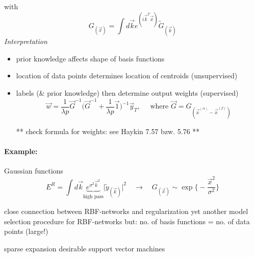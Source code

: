 with
\begin{equation} \tag{Fourier-transform of filter}
	G_{(\vec{x})} = \int d \vec{k} e^{(i \vec{k}^T \vec{x})}
		\widetilde{G}_{(\vec{k})}
\end{equation}
\emph{Interpretation}
\begin{itemize}
\item prior knowledge affects shape of basis functions
\item location of data points determines location of centroids (unsupervised)
\item labels (\& prior knowledge) then determine output weights (supervised)
\begin{equation}
	\vec{w} = \frac{1}{\lambda p} \vec{G}^{-1} 
		\bigg( \vec{G}^{-1} + \frac{1}{\lambda p} \vec{1} \bigg)^{-1}
		\vec{y}_T,\quad \text{ where } \vec{G} = G_{(\vec{x}^{(\alpha)} 
			- \vec{x}^{(\beta)})}
\end{equation}

** check formula for weights: see Haykin 7.57 bzw. 5.76 **

\end{itemize}
\paragraph{Example:} Gaussian functions
\begin{equation}
	E^R = \int d \vec{k} \underbrace{e^{\sigma^2 \vec{k}^2}}_{\text{
		high pass}} \big| \tilde{y}_{(\vec{k})} \big|^2 \quad
	\rightarrow \quad G_{(\vec{x})} \sim \exp \bigg\{ 
		-\frac{\vec{x}^2}{\sigma^2} \bigg\}
\end{equation}
\begin{itemize}
	\itR close connection between RBF-networks and regularization
	\itR yet another model selection procedure for RBF-networks
	\itR but: no. of basis functions = no. of data points (large!)
	\begin{itemize}
		\itl sparse expansion desirable
		\itl support vector machines
	\end{itemize}
\end{itemize}


